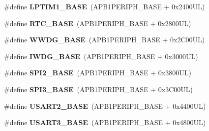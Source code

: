 \begin{DoxyCompactItemize}
\item 
\mbox{\label{group___peripheral__memory__map_ga012ceb003fbb615eedb39a8d7f31c9c6}} 
\#define {\bfseries L\+P\+T\+I\+M1\+\_\+\+B\+A\+SE}~(A\+P\+B1\+P\+E\+R\+I\+P\+H\+\_\+\+B\+A\+SE + 0x2400\+U\+L)
\item 
\mbox{\label{group___peripheral__memory__map_ga4265e665d56225412e57a61d87417022}} 
\#define {\bfseries R\+T\+C\+\_\+\+B\+A\+SE}~(A\+P\+B1\+P\+E\+R\+I\+P\+H\+\_\+\+B\+A\+SE + 0x2800\+U\+L)
\item 
\mbox{\label{group___peripheral__memory__map_ga9a5bf4728ab93dea5b569f5b972cbe62}} 
\#define {\bfseries W\+W\+D\+G\+\_\+\+B\+A\+SE}~(A\+P\+B1\+P\+E\+R\+I\+P\+H\+\_\+\+B\+A\+SE + 0x2\+C00\+U\+L)
\item 
\mbox{\label{group___peripheral__memory__map_ga8543ee4997296af5536b007cd4748f55}} 
\#define {\bfseries I\+W\+D\+G\+\_\+\+B\+A\+SE}~(A\+P\+B1\+P\+E\+R\+I\+P\+H\+\_\+\+B\+A\+SE + 0x3000\+U\+L)
\item 
\mbox{\label{group___peripheral__memory__map_gac3e357b4c25106ed375fb1affab6bb86}} 
\#define {\bfseries S\+P\+I2\+\_\+\+B\+A\+SE}~(A\+P\+B1\+P\+E\+R\+I\+P\+H\+\_\+\+B\+A\+SE + 0x3800\+U\+L)
\item 
\mbox{\label{group___peripheral__memory__map_gae634fe8faa6922690e90fbec2fc86162}} 
\#define {\bfseries S\+P\+I3\+\_\+\+B\+A\+SE}~(A\+P\+B1\+P\+E\+R\+I\+P\+H\+\_\+\+B\+A\+SE + 0x3\+C00\+U\+L)
\item 
\mbox{\label{group___peripheral__memory__map_gade83162a04bca0b15b39018a8e8ec090}} 
\#define {\bfseries U\+S\+A\+R\+T2\+\_\+\+B\+A\+SE}~(A\+P\+B1\+P\+E\+R\+I\+P\+H\+\_\+\+B\+A\+SE + 0x4400\+U\+L)
\item 
\mbox{\label{group___peripheral__memory__map_gabe0d6539ac0026d598274ee7f45b0251}} 
\#define {\bfseries U\+S\+A\+R\+T3\+\_\+\+B\+A\+SE}~(A\+P\+B1\+P\+E\+R\+I\+P\+H\+\_\+\+B\+A\+SE + 0x4800\+U\+L)
\item 

\end{DoxyCompactItemize}
